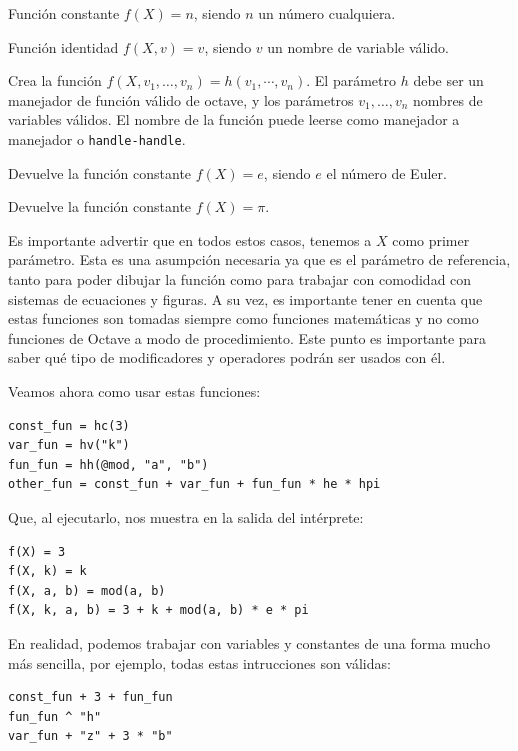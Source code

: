 \documentclass{article}
\begin{document}
\begin{description}[font = \normalfont\itshape]
\item[hc(n)] Función constante $f(X) = n$, siendo $n$ un número
  cualquiera.
\item[hv(v)] Función identidad $f(X, v) = v$, siendo $v$ un nombre de
  variable válido.
\item[hh(h, $v_1$, $\ldots$, $v_n$)] Crea la función $f(X, v_1, \ldots,
  v_n) = h(v_1, \cdots, v_n)$. El parámetro $h$ debe ser un
  manejador de función válido de octave, y los parámetros $v_1,
  \ldots, v_n$ nombres de variables válidos. El nombre de la función
  puede leerse como manejador a manejador o \texttt{handle-handle}.
\item[he] Devuelve la función constante $f(X) = e$, siendo $e$ el
  número de Euler.
\item[hpi] Devuelve la función constante $f(X) = \pi$.
\end{description}

Es importante advertir que en todos estos casos, tenemos a $X$ como
primer parámetro. Esta es una asumpción necesaria ya que es el
parámetro de referencia, tanto para poder dibujar la función como para
trabajar con comodidad con sistemas de ecuaciones y figuras. A su vez,
es importante tener en cuenta que estas funciones son tomadas siempre
como funciones matemáticas y no como funciones de Octave a modo de
procedimiento. Este punto es importante para saber qué tipo de
modificadores y operadores podrán ser usados con él.

Veamos ahora como usar estas funciones:

\begin{verbatim}
const_fun = hc(3)
var_fun = hv("k")
fun_fun = hh(@mod, "a", "b")
other_fun = const_fun + var_fun + fun_fun * he * hpi
\end{verbatim}

Que, al ejecutarlo, nos muestra en la salida del intérprete:

\begin{verbatim}
f(X) = 3
f(X, k) = k
f(X, a, b) = mod(a, b)
f(X, k, a, b) = 3 + k + mod(a, b) * e * pi
\end{verbatim}

En realidad, podemos trabajar con variables y constantes de una forma
mucho más sencilla, por ejemplo, todas estas intrucciones son válidas:

\begin{verbatim}
const_fun + 3 + fun_fun
fun_fun ^ "h"
var_fun + "z" + 3 * "b"
\end{verbatim}
\end{document}
